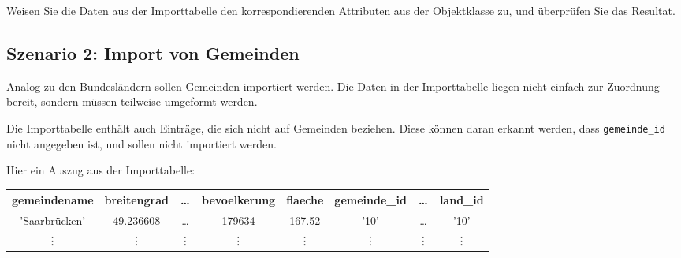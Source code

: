 \vspace{\baselineskip}\noindent
Weisen Sie die Daten aus der Importtabelle den korrespondierenden Attributen aus der Objektklasse zu, und überprüfen Sie das Resultat.

\clearpage

\subsection*{Szenario 2: Import von Gemeinden}

\vspace{\baselineskip}\noindent
Analog zu den Bundesländern sollen Gemeinden importiert werden. Die Daten in der Importtabelle liegen nicht einfach zur Zuordnung bereit, sondern müssen teilweise umgeformt werden.

\noindent Die Importtabelle enthält auch Einträge, die sich nicht auf Gemeinden beziehen. Diese
können daran erkannt werden, dass \texttt{gemeinde\_id} nicht angegeben ist, und sollen nicht importiert werden.

\vspace{\baselineskip}\noindent
Hier ein Auszug aus der Importtabelle:
\begin{flushleft}
  \begin{tabular}{|| c | c | c | c | c | c | c | c ||}
    \hline
    gemeindename  & breitengrad & \dots  & bevoelkerung & flaeche & gemeinde\_id & \dots  & land\_id \\ [0.5ex]
    \hline\hline
    'Saarbrücken' & 49.236608   & \dots  & 179634       & 167.52  & '10'         & \dots  & '10'     \\
    \hline
    \vdots        & \vdots      & \vdots & \vdots       & \vdots  & \vdots       & \vdots & \vdots   \\
    \hline
  \end{tabular}
\end{flushleft}

